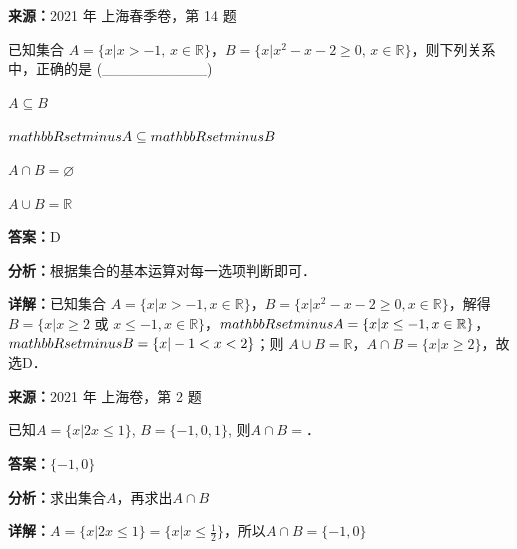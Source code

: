 \begin{question}[points=5]
\textbf{来源：}2021 年 上海春季卷，第 14 题\par
已知集合 $A=\{x|x>-1,\,x\in\mathbb{R}\}$，$B=\{x|x^2-x-2\ge 0,\,x\in\mathbb{R}\}$，则下列关系中，正确的是 (\_\_\_\_\_\_\_\_\_\_)
\begin{choices}
  \item $A\subseteq B$
  \item $\\mathbb{R}\\setminus A\subseteq\\mathbb{R}\\setminus B$
  \item $A\cap B=\varnothing$
  \item $A\cup B=\mathbb{R}$
\end{choices}
\begin{solution}
\textbf{答案：}D

\textbf{分析：}根据集合的基本运算对每一选项判断即可．

\textbf{详解：}已知集合 $A=\{x|x>-1,x\in\mathbb{R}\}$，$B=\{x|x^2-x-2\ge 0,x\in\mathbb{R}\}$，解得 $B=\{x|x\ge 2\text{ 或 }x\le -1,x\in\mathbb{R}\}$，$\\mathbb{R}\\setminus A=\{x|x\le -1,x\in\mathbb{R}\}$，$\\mathbb{R}\\setminus B=\{x|-1<x<2\}$；则 $A\cup B=\mathbb{R}$，$A\cap B=\{x|x\ge 2\}$，故选D．
\end{solution}
\end{question}

\begin{question}[points=4]
\textbf{来源：}2021 年 上海卷，第 2 题\par
已知$A=\{x|2x\le 1\}$, $B=\{-1,0,1\}$, 则$A\cap B=$．
\fillin[{$\{-1,0\}$}]
\begin{solution}
\textbf{答案：}$\{-1,0\}$

\textbf{分析：}求出集合$A$，再求出$A\cap B$

\textbf{详解：}$A=\{x|2x\le 1\}=\{x|x\le \frac{1}{2}\}$，所以$A\cap B=\{-1,0\}$
\end{solution}
\end{question}

